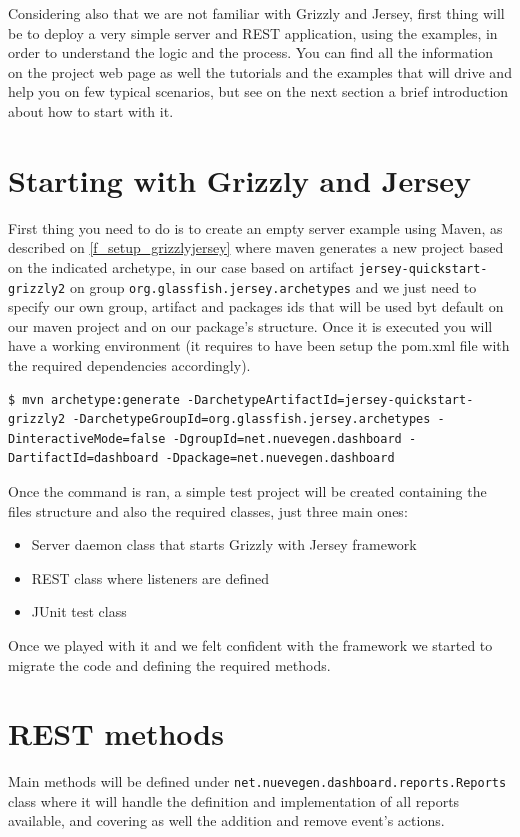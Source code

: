 Considering also that we are not familiar with Grizzly and Jersey, first thing
will be to deploy a very simple server and REST application, using the examples,
in order to understand the logic and the process. You can find all the
information on the project web page as well the tutorials and the examples that
will drive and help you on few typical scenarios, but see on the next section a
brief introduction about how to start with it.

\section{Starting with Grizzly and Jersey}
First thing you need to do is to create an empty server example using Maven,
as described on \ref{f_setup_grizzlyjersey} where maven generates a new
project based on the indicated archetype, in our case based on artifact
\texttt{jersey-quickstart-grizzly2} on group
\texttt{org.glassfish.jersey.archetypes} and we just need to specify our own
group, artifact and packages ids that will be used byt default on our maven
project and on our package's structure. Once it is executed you will have a
working environment (it requires to have been setup the pom.xml file with the required dependencies accordingly).\\

\begin{lstlisting}[style=console,caption=Grizzly\ and\ Jersey\ First\ setup,label=f_setup_grizzlyjersey] 
$ mvn archetype:generate -DarchetypeArtifactId=jersey-quickstart-grizzly2 -DarchetypeGroupId=org.glassfish.jersey.archetypes -DinteractiveMode=false -DgroupId=net.nuevegen.dashboard -DartifactId=dashboard -Dpackage=net.nuevegen.dashboard 
\end{lstlisting}

Once the command is ran, a simple test project will be created containing the
files structure and also the required classes, just three main ones: 
\begin{itemize}
  \item Server daemon class that starts Grizzly with Jersey framework
  \item REST class where listeners are defined
  \item JUnit test class
\end{itemize}

Once we played with it and we felt confident with the framework we started
to migrate the code and defining the required methods.

\section{REST methods}
Main methods will be defined under
\texttt{net.nuevegen.dashboard.reports.Reports} class where it will handle
the definition and implementation of all reports available, and covering as well
the addition and remove event's actions. 

